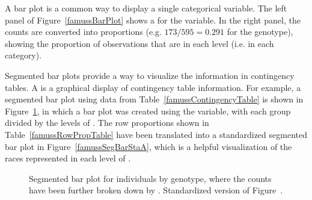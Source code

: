 A bar plot is a common way to display a single categorical variable. The left panel of Figure~\ref{famussBarPlot} shows a  for the  variable. In the right panel, the counts are converted into proportions (e.g. $173/595=0.291$ for the  genotype), showing the proportion of observations that are in each level (i.e. in each category).

Segmented bar plots provide a way to visualize the information in contingency tables. A  is a graphical display of contingency table information. For example, a segmented bar plot using data from Table~\ref{famussContingencyTable} is shown in Figure~\ref{famussSegBarPlotA}, in which a bar plot was created using the  variable, with each group divided by the levels of . The row proportions shown in Table~\ref{famussRowPropTable} have been translated into a standardized segmented bar plot in Figure~\ref{famussSegBarStaA}, which is a helpful visualization of the races represented in each level of .

\begin{figure}[h!]
	\centering
	\caption{ Segmented bar plot for individuals by genotype, where the counts have been further broken down by .  Standardized version of Figure~.}
	\label{famussSegBarPlotA}
\end{figure}


